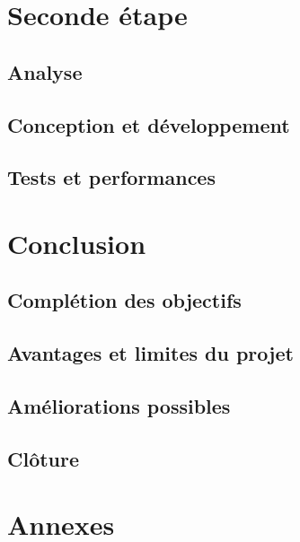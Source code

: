 \documentclass[a4paper, 12pt]{report}
\begin{document}
\chapter{Seconde étape}
\minitoc
{}
\clearpage
\section{Analyse}
\section{Conception et développement}
\section{Tests et performances}

\chapter{Conclusion}
\minitoc
{}
\clearpage
\section{Complétion des objectifs}
\section{Avantages et limites du projet}
\section{Améliorations possibles}
\section{Clôture}

\chapter{Annexes}
\minitoc
{}
\clearpage

\appendix
\end{document}

